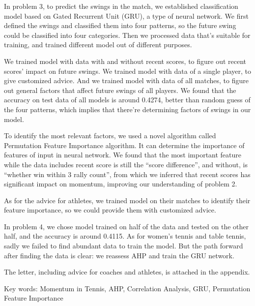 In problem 3, to predict the swings in the match, we established classification model based on Gated Recurrent Unit (GRU),
a type of neural network.
We first defined the swings and classified them into four patterns, so the future swing could be classified into
four categories. Then we processed data that's suitable for training, and trained different model out of different purposes.

We trained model with data with and without recent scores, to figure out recent scores' impact on future swings.
We trained model with data of a single player, to give customized advice.
And we trained model with data of all matches, to figure out general factors that affect future swings of all players.
We found that the accuracy on test data of all models is around 0.4274, better than random guess of the four patterns,
which implies that there're determining factors of swings in our model.

To identify the most relevant factors, we used a novel algorithm called Permutation Feature Importance algorithm.
It can determine the importance of features of input in neural network. We found that the most important feature while
the data includes recent score is still the ``score difference'', and without, is ``whether win within 3 rally count'',
from which we inferred that recent scores has significant impact on momentum,
improving our understanding of problem 2.

As for the advice for athletes, we trained model on their matches to identify their feature importance,
so we could provide them with customized advice.

In problem 4, we chose model trained on half of the data and tested on the other half, and the accuracy is around 0.4115.
As for women's tennis and table tennis, sadly we failed to find abundant data to train the model.
But the path forward after finding the data is clear: we reassess AHP and train the GRU network.

The letter, including advice for coaches and athletes, is attached in the appendix.

Key words: Momentum in Tennis, AHP, Correlation Analysis, GRU, Permutation Feature Importance